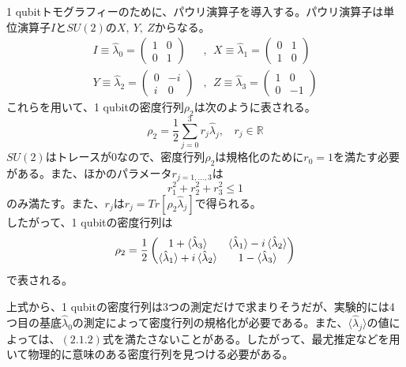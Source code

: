 \documentclass[11pt,a4j,notitlepage]{jreport}
\begin{document}
	1 qubitトモグラフィーのために、パウリ演算子を導入する。パウリ演算子は単位演算子$I$と$SU(2)$の$X,\ Y,\ Z$からなる。
	\begin{equation}
		\begin{aligned}
			I \equiv \hat{\lambda}_0 = \begin{pmatrix} 1 & 0 \\ 0 & 1 \end{pmatrix}&,\ \ X \equiv \hat{\lambda}_1 = \begin{pmatrix} 0 & 1 \\ 1 & 0 \end{pmatrix}\\
			Y \equiv \hat{\lambda}_2 = \begin{pmatrix} 0 & -i \\ i & 0 \end{pmatrix}&,\ \ Z \equiv \hat{\lambda}_3 = \begin{pmatrix} 1 & 0 \\ 0 & -1 \end{pmatrix}
		\end{aligned}
		\label{eq2.3}
	\end{equation}
	これらを用いて、1 qubitの密度行列$\rho_2$は次のように表される。
	\begin{equation}
		\rho_2 = \frac{1}{2} \sum_{j=0}^3 r_j \hat{\lambda}_j, \ \ \ \ r_j \in \mathbb{R}
		\label{eq2.4}
	\end{equation}
	$SU(2)$はトレースが0なので、密度行列$\rho_2$は規格化のために$r_0 = 1$を満たす必要がある。また、ほかのパラメータ$r_{j=1,...,3}$は
	\begin{equation}
		r_1^2 + r_2^2 + r_3^2 \leq 1
		\label{eq2.5}
	\end{equation}
	のみ満たす。また、$r_j$は$r_j = Tr[\rho_2 \hat{\lambda}_j]$で得られる。\\
	
	したがって、1 qubitの密度行列は
	\begin{equation}
		\rho_2 = \frac{1}{2} \begin{pmatrix}
			1 + \braket{\hat{\lambda}_3} &
			\braket{\hat{\lambda}_1} - i \braket{\hat{\lambda}_2} \\
			\braket{\hat{\lambda}_1} + i \braket{\hat{\lambda}_2} &
			1 - \braket{\hat{\lambda}_3}
			\end{pmatrix}
	\end{equation}
	で表される。
	
	上式から、1 qubitの密度行列は3つの測定だけで求まりそうだが、実験的には4つ目の基底$\hat{\lambda}_0$の測定によって密度行列の規格化が必要である。また、$\langle \hat{\lambda}_j \rangle$の値によっては、$(2.1.2)$式を満たさないことがある。したがって、最尤推定などを用いて物理的に意味のある密度行列を見つける必要がある。
\end{document}
